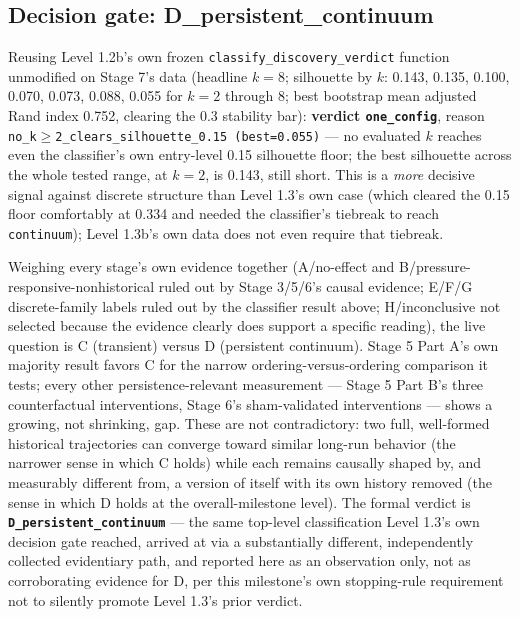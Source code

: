 \subsection{Decision gate: D\_persistent\_continuum}
\label{sec:level13b-decision-gate}

Reusing Level 1.2b's own frozen \texttt{classify\_discovery\_verdict}
function unmodified on Stage 7's data (headline $k{=}8$; silhouette by
$k$: 0.143, 0.135, 0.100, 0.070, 0.073, 0.088, 0.055 for $k{=}2$ through
8; best bootstrap mean adjusted Rand index 0.752, clearing the 0.3
stability bar): \textbf{verdict \texttt{one\_config}}, reason
\texttt{no\_k$\geq$2\_clears\_silhouette\_0.15 (best=0.055)} --- no
evaluated $k$ reaches even the classifier's own entry-level 0.15
silhouette floor; the best silhouette across the whole tested range, at
$k{=}2$, is 0.143, still short. This is a \textit{more} decisive signal
against discrete structure than Level 1.3's own case (which cleared the
0.15 floor comfortably at 0.334 and needed the classifier's tiebreak to
reach \texttt{continuum}); Level 1.3b's own data does not even require
that tiebreak.

Weighing every stage's own evidence together (A/no-effect and
B/pressure-responsive-nonhistorical ruled out by Stage 3/5/6's causal
evidence; E/F/G discrete-family labels ruled out by the classifier result
above; H/inconclusive not selected because the evidence clearly does
support a specific reading), the live question is C (transient) versus D
(persistent continuum). Stage 5 Part A's own majority result favors C for
the narrow ordering-versus-ordering comparison it tests; every other
persistence-relevant measurement --- Stage 5 Part B's three counterfactual
interventions, Stage 6's sham-validated interventions --- shows a growing,
not shrinking, gap. These are not contradictory: two full, well-formed
historical trajectories can converge toward similar long-run behavior
(the narrower sense in which C holds) while each remains causally shaped
by, and measurably different from, a version of itself with its own
history removed (the sense in which D holds at the overall-milestone
level). The formal verdict is \textbf{\texttt{D\_persistent\_continuum}}
--- the same top-level classification Level 1.3's own decision gate
reached, arrived at via a substantially different, independently collected
evidentiary path, and reported here as an observation only, not as
corroborating evidence for D, per this milestone's own stopping-rule
requirement not to silently promote Level 1.3's prior verdict.

